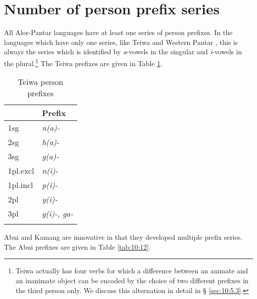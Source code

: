 \section{Number of person prefix series}
\label{sec:10:3}
All Alor-Pantar languages have at least one series of person prefixes. In the languages which have only one series, like Teiwa and Western Pantar \citep{Holton2010person}, this is always the series which is identified by \textit{a}{}-vowels in the singular and \textit{i}{}-vowels in the plural.\footnote{Teiwa
 actually has four verbs for which a difference between an animate and an inanimate object can be encoded by the choice of two different prefixes in the third person  only. We discuss this alternation in detail in {\S} \ref{sec:10:5.3}.}
The Teiwa prefixes are given in Table \ref{tab:10:11}.

\begin{table}
\caption{Teiwa person prefixes \citep[77, 78]{Klamer2010grammar}}
\label{tab:10:11}
\begin{tabularx}{.5\textwidth}{>{\sc}XX}
\lsptoprule
& Prefix\\
\midrule
1sg & {\itshape n(a)-}\\
2sg & {\itshape h(a)-}\\
3sg & {\itshape g(a)-}\\
1pl.excl & {\itshape n(i)-}\\
1pl.incl & {\itshape p(i)-}\\
2pl & {\itshape y(i)-}\\
3pl & {\itshape g(i)-, ga-}\\
\lspbottomrule
\end{tabularx}
\end{table}

Abui and Kamang are innovative in that they developed multiple prefix series. The Abui prefixes are given in Table \ref{tab:10:12}.


